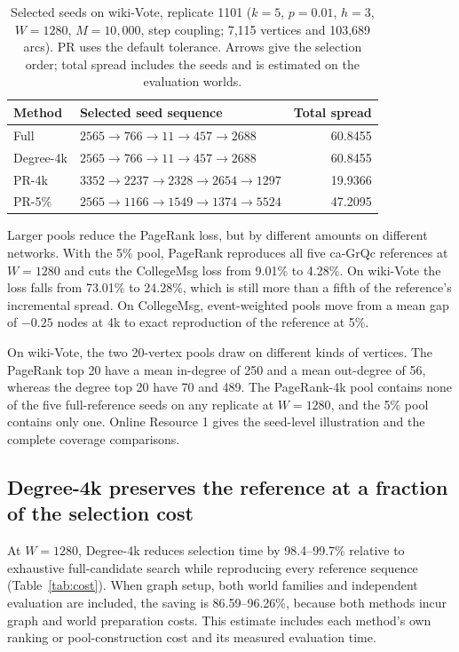 \documentclass[smallextended]{svjour3}
\newcommand{\CollegePRLoss}{9.01}
\newcommand{\CollegePRfiveLoss}{4.28}
\newcommand{\CollegeDegreeSaving}{86.59}
\newcommand{\WikiPRLoss}{73.01}
\newcommand{\WikiPRfiveLoss}{24.28}
\newcommand{\WikiDegreeSaving}{96.26}
\begin{document}
\begin{table}[htbp]
\caption{Selected seeds on wiki-Vote, replicate 1101 ($k=5$, $p=0.01$, $h=3$, $W=1280$, $M=10{,}000$, step coupling; 7,115 vertices and 103,689 arcs). PR uses the default tolerance. Arrows give the selection order; total spread includes the seeds and is estimated on the evaluation worlds.}\label{tab:case}
\begin{tabularx}{\linewidth}{lXr}\toprule
Method & Selected seed sequence & Total spread \\ \midrule
Full & $2565\to 766\to 11\to 457\to 2688$ & 60.8455 \\
Degree-4k & $2565\to 766\to 11\to 457\to 2688$ & 60.8455 \\
PR-4k & $3352\to 2237\to 2328\to 2654\to 1297$ & 19.9366 \\
PR-5\% & $2565\to 1166\to 1549\to 1374\to 5524$ & 47.2095 \\
\bottomrule\end{tabularx}
\end{table}

Larger pools reduce the PageRank loss, but by different amounts on different networks. With the 5\% pool, PageRank reproduces all five ca-GrQc references at $W=1280$ and cuts the CollegeMsg loss from \CollegePRLoss{}\% to \CollegePRfiveLoss{}\%. On wiki-Vote the loss falls from \WikiPRLoss{}\% to \WikiPRfiveLoss{}\%, which is still more than a fifth of the reference's incremental spread. On CollegeMsg, event-weighted pools move from a mean gap of $-0.25$ nodes at 4k to exact reproduction of the reference at 5\%.

On wiki-Vote, the two 20-vertex pools draw on different kinds of vertices. The PageRank top 20 have a mean in-degree of 250 and a mean out-degree of 56, whereas the degree top 20 have 70 and 489. The PageRank-4k pool contains none of the five full-reference seeds on any replicate at $W=1280$, and the 5\% pool contains only one. Online Resource 1 gives the seed-level illustration and the complete coverage comparisons.

\subsection{Degree-4k preserves the reference at a fraction of the selection cost}
At $W=1280$, Degree-4k reduces selection time by 98.4--99.7\% relative to exhaustive full-candidate search while reproducing every reference sequence (Table~\ref{tab:cost}). When graph setup, both world families and independent evaluation are included, the saving is \CollegeDegreeSaving{}--\WikiDegreeSaving{}\%, because both methods incur graph and world preparation costs. This estimate includes each method's own ranking or pool-construction cost and its measured evaluation time.
\end{document}
